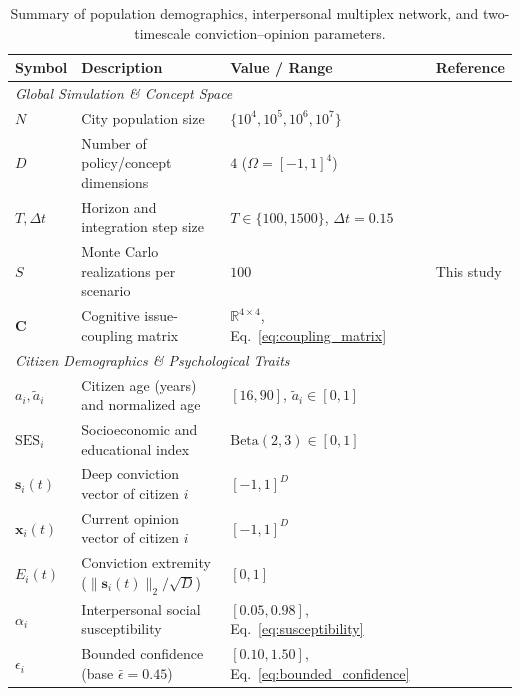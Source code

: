 \documentclass{article}
\begin{document}
\begin{table}[htbp]
\centering
\caption{Summary of population demographics, interpersonal multiplex network, and two-timescale conviction--opinion parameters.}
\label{tab:model_parameters}
\footnotesize
\setlength{\tabcolsep}{4.5pt}
\begin{tabular}{lp{5.1cm}p{3.6cm}p{3.8cm}}
\toprule
\textbf{Symbol} & \textbf{Description} & \textbf{Value / Range} & \textbf{Reference} \\
\midrule
\multicolumn{4}{l}{\textit{Global Simulation \& Concept Space}} \\
$N$ & City population size & $\{10^4, 10^5, 10^6, 10^7\}$ & \citet{bettencourt2007growth} \\
$D$ & Number of policy/concept dimensions & $4$ ($\Omega = [-1, 1]^4$) & \citet{converse1964nature} \\
$T, \Delta t$ & Horizon and integration step size & $T \in \{100, 1500\}$, $\Delta t = 0.15$ & \citet{friedkin1990social} \\
$S$ & Monte Carlo realizations per scenario & $100$ & This study \\
$\mathbf{C}$ & Cognitive issue-coupling matrix & $\mathbb{R}^{4 \times 4}$, Eq.~\eqref{eq:coupling_matrix} & \citet{friedkin2016network} \\
\midrule
\multicolumn{4}{l}{\textit{Citizen Demographics \& Psychological Traits}} \\
$a_i, \tilde{a}_i$ & Citizen age (years) and normalized age & $[16, 90]$, $\tilde{a}_i \in [0, 1]$ & \citet{ibge2022censo} \\
$\mathrm{SES}_i$ & Socioeconomic and educational index & $\mathrm{Beta}(2, 3) \in [0, 1]$ & \citet{ibge2022censo} \\
$\mathbf{s}_i(t)$ & Deep conviction vector of citizen $i$ & $[-1, 1]^D$ & \citet{converse1964nature, kiley2020measuring} \\
$\mathbf{x}_i(t)$ & Current opinion vector of citizen $i$ & $[-1, 1]^D$ & \citet{zaller1992nature} \\
$E_i(t)$ & Conviction extremity ($\|\mathbf{s}_i(t)\|_2 / \sqrt{D}$) & $[0, 1]$ & \citet{howe2017attitude} \\
$\alpha_i$ & Interpersonal social susceptibility & $[0.05, 0.98]$, Eq.~\eqref{eq:susceptibility} & \citet{friedkin1990social, alwin1991aging} \\
$\epsilon_i$ & Bounded confidence (base $\bar{\epsilon}=0.45$) & $[0.10, 1.50]$, Eq.~\eqref{eq:bounded_confidence} & \citet{deffuant2000mixing, hegselmann2002opinion} \\

\end{tabular}
\end{table}
\end{document}

